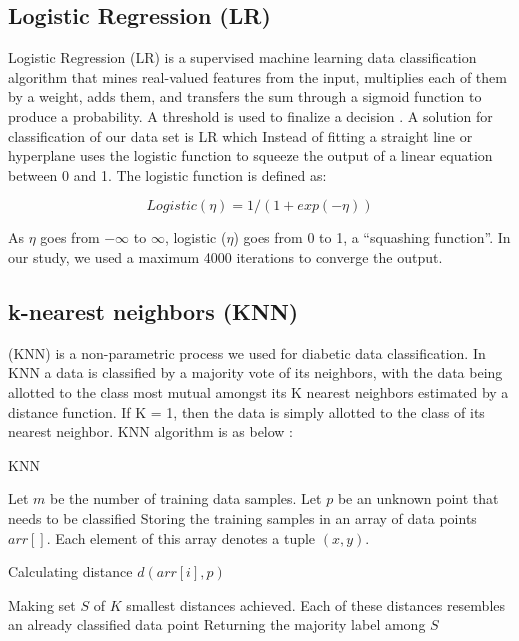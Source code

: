 \subsection{Logistic Regression (LR)}

Logistic Regression (LR) is a supervised machine learning data classification algorithm that mines real-valued features from the input, multiplies each of them by a weight, adds them, and transfers the sum through a sigmoid function to produce a probability. A threshold is used to finalize a decision \cite{DSR}. A solution for classification of our data set is LR which Instead of fitting a straight line or hyperplane uses the logistic function to squeeze the output of a linear equation between 0 and 1. The logistic function is defined as:

\[Logistic (\eta) = 1/(1 + exp (-\eta))\]

As $\eta$ goes from $-\infty$ to $\infty$, logistic ($\eta$) goes from 0 to 1, a “squashing function”. In our study, we used a maximum 4000 iterations to converge the output.


\subsection{k-nearest neighbors (KNN) }
 (KNN) is a non-parametric process we used for diabetic data classification. In KNN a data is classified by a majority vote of its neighbors, with the data being allotted to the class most mutual amongst its K nearest neighbors estimated by a distance function. If K = 1, then the data is simply allotted to the class of its nearest neighbor. KNN algorithm is as below : 

\begin{algorithm}
\caption{KNN}
\label{pseudoPSO}
\begin{algorithmic}[1]
\State Let $m$ be the number of training data samples. Let $p$ be an unknown point that needs to be classified
\State Storing the training samples in an array of data points $arr[]$. Each element of this array denotes a tuple $(x, y)$.

    \State Calculating distance $d(arr[i], p)$
   
\EndFor
\State Making set $S$ of $K$ smallest distances achieved. Each of these distances resembles an already classified data point
\State Returning the majority label among $S$
\end{algorithmic}
\end{algorithm}


